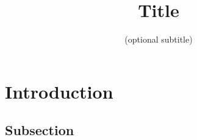 \documentclass[]{finalproject}
\title{Title}
\subtitle{(optional subtitle)}
\begin{document}
\maketitle

\section{Introduction} \label{introduction}

\subsection{Subsection}



\clearpage


\end{document}
